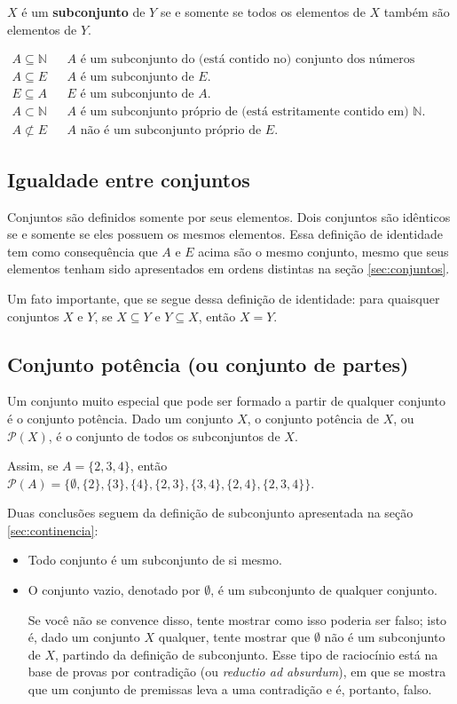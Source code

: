 \documentclass[11pt]{article}
\begin{document}
\(X\) é um \textbf{subconjunto} de \(Y\) se e somente se todos os elementos de \(X\) também são elementos de \(Y\).

\begin{align*}
  A \subseteq \mathbb{N} & & A \text{ é um subconjunto do (está contido no) conjunto dos números naturais.}\\
  A \subseteq E & & A \text{ é um subconjunto de } E.\\
  E \subseteq A & & E \text{ é um subconjunto de } A.\\
  A \subset \mathbb{N} & & A \text{ é um subconjunto próprio de (está estritamente contido em) } \mathbb{N}.\\
  A \not\subset E & & A \text{ não é um subconjunto próprio de } E.
\end{align*}

\subsection{Igualdade entre conjuntos}
\label{sec:igualdade}

Conjuntos são definidos somente por seus elementos. Dois conjuntos são idênticos se e somente se eles possuem os mesmos elementos. Essa definição de identidade tem como consequência que \(A\) e \(E\) acima são o mesmo conjunto, mesmo que seus elementos tenham sido apresentados em ordens distintas na seção \ref{sec:conjuntos}.

Um fato importante, que se segue dessa definição de identidade: para quaisquer conjuntos \(X\) e \(Y\), se \(X\subseteq Y\) e \(Y\subseteq X\), então \(X = Y\).

\subsection{Conjunto potência (ou conjunto de partes)}
\label{sec:conjunto-potencia}

Um conjunto muito especial que pode ser formado a partir de qualquer conjunto é o conjunto potência. Dado um conjunto \(X\), o conjunto potência de \(X\), ou \(\mathcal{P}(X)\), é o conjunto de todos os subconjuntos de \(X\).

Assim, se \(A = \{2, 3, 4\}\), então \(\mathcal{P}(A) = \{\emptyset, \{2\}, \{3\}, \{4\}, \{2, 3\}, \{3, 4\}, \{2, 4\}, \{2, 3, 4\}\}\).

Duas conclusões seguem da definição de subconjunto apresentada na seção \ref{sec:continencia}:
\begin{itemize}
\item Todo conjunto é um subconjunto de si mesmo.
\item O conjunto vazio, denotado por \(\emptyset\), é um subconjunto de qualquer conjunto.

  Se você não se convence disso, tente mostrar como isso poderia ser falso; isto é, dado um conjunto \(X\) qualquer, tente mostrar que \(\emptyset\) não é um subconjunto de \(X\), partindo da definição de subconjunto. Esse tipo de raciocínio está na base de provas por contradição (ou \emph{reductio ad absurdum}), em que se mostra que um conjunto de premissas leva a uma contradição e é, portanto, falso.
\end{itemize}
\end{document}
